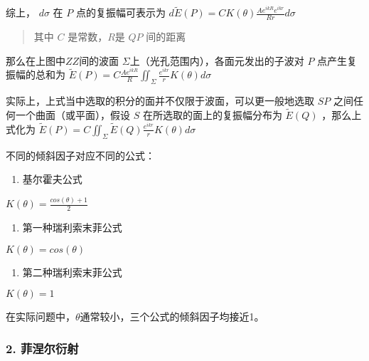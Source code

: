 \documentclass[a4paper,10pt,english]{sphinxmanual}
\begin{document}
\sphinxAtStartPar
综上， \(d\sigma\)  在 \(P\) 点的复振幅可表示为
\(d\tilde{E}(P)=CK(\theta)\frac{Ae^{ikR}e^{ikr}}{Rr}d\sigma\)
\begin{quote}

\sphinxAtStartPar
其中 \(C\) 是常数，\(R\)是 \(QP\) 间的距离
\end{quote}

\sphinxAtStartPar
那么在上图中\(ZZ\)间的波面 \(Σ\)上（光孔范围内），各面元发出的子波对 \(P\) 点产生复振幅的总和为
\(\tilde{E}(P)=C\frac{Ae^{ikR}}{R}\iint_{\Sigma}{\frac{e^{ikr}}{r}K(\theta)d\sigma}\)

\sphinxAtStartPar
实际上，上式当中选取的积分的面并不仅限于波面，可以更一般地选取 \(SP\) 之间任何一个曲面（或平面），假设 \(S\) 在所选取的面上的复振幅分布为 \(\tilde{E}(Q)\) ，那么上式化为
\(\tilde{E}(P)=C\iint_{\Sigma}{\tilde{E}(Q)\frac{e^{ikr}}{r}K(\theta)d\sigma}\)

\sphinxAtStartPar
不同的倾斜因子对应不同的公式：
\begin{enumerate}
%
\item {} 
\sphinxAtStartPar
基尔霍夫公式

\end{enumerate}

\sphinxAtStartPar
\(K(\theta)=\frac{cos(\theta)+1}{2}\)
\begin{enumerate}
%
\setcounter{enumi}{1}
\item {} 
\sphinxAtStartPar
第一种瑞利\textendash{}索末菲公式

\end{enumerate}

\sphinxAtStartPar
\(K(\theta)=cos(\theta)\)
\begin{enumerate}
%
\setcounter{enumi}{2}
\item {} 
\sphinxAtStartPar
第二种瑞利\textendash{}索末菲公式

\end{enumerate}

\sphinxAtStartPar
\(K(\theta)=1\)

\sphinxAtStartPar
在实际问题中，\(\theta\)通常较小，三个公式的倾斜因子均接近1。


\subsubsection{2. 菲涅尔衍射}
\label{\detokenize{_u7b80_u4ecb/_u6838_u5fc3_u8bbe_u8ba1_u4f18_u5316_u7b97_u6cd5/_u8fdc_u573a_u4f20_u64ad_u6a21_u5757/contents:id3}}
\end{document}
